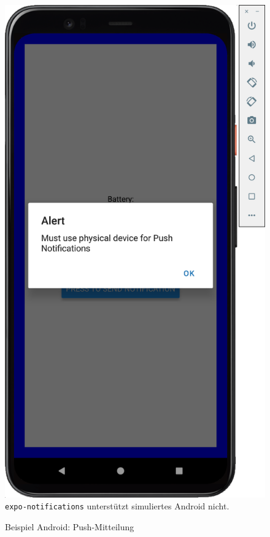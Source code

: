 \documentclass[a4paper]{scrartcl}
\begin{document}
\begin{figure}[H]
	\centering
	\caption{Beispiel Android: Push-Mitteilung}
	\includegraphics[scale=0.25]{_assets/Android_push_notification.png} \\
	\justifying
	\small	
	\texttt{expo-notifications} unterstützt simuliertes Android nicht. 
\end{figure}
\end{document}
